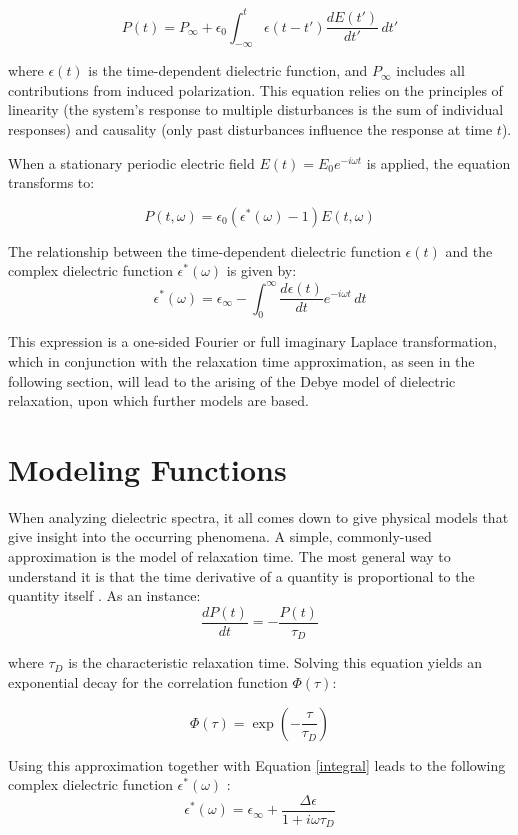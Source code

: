 \[
P(t) = P_\infty + \epsilon_0 \int_{-\infty}^{t} \epsilon(t - t') \frac{dE(t')}{dt'} \, dt'
\]

where \( \epsilon(t) \) is the time-dependent dielectric function, and \( P_\infty \) includes all contributions from induced polarization. This equation relies on the principles of linearity (the system's response to multiple disturbances is the sum of individual responses) and causality (only past disturbances influence the response at time \( t \)).

When a stationary periodic electric field \( E(t) = E_0 e^{-i\omega t} \) is applied, the equation transforms to:

\[
P(t, \omega) = \epsilon_0 \left(\epsilon^*(\omega) - 1\right) E(t, \omega)
\]

The relationship between the time-dependent dielectric function \( \epsilon(t) \) and the complex dielectric function \( \epsilon^*(\omega) \) is given by:
\begin{equation}
\epsilon^*(\omega) = \epsilon_\infty - \int_{0}^{\infty} \frac{d\epsilon(t)}{dt} e^{-i\omega t} \, dt
\label{integral}
\end{equation}

This expression is a one-sided Fourier or full imaginary Laplace transformation, which in conjunction with the relaxation time approximation, as seen in the following section, will lead to the arising of the Debye model of dielectric relaxation, upon which further models are based.
\section{Modeling Functions}

When analyzing dielectric spectra, it all comes down to give physical models that give insight into the occurring phenomena. A simple, commonly-used approximation is the model of relaxation time. The most general way to understand it is that the time derivative of a quantity is proportional to the quantity itself \cite{grundmann2021}. As an instance:
\[
\frac{dP(t)}{dt} = -\frac{P(t)}{\tau_D}
\]

where \( \tau_D \) is the characteristic relaxation time. Solving this equation yields an exponential decay for the correlation function \( \Phi(\tau) \):

\[
\Phi(\tau) = \exp\left(-\frac{\tau}{\tau_D}\right)
\]

Using this approximation together with Equation \ref{integral} leads to the following complex dielectric function \( \epsilon^*(\omega) \) \cite{kremer2003}:
\begin{equation}
\label{debye}
\epsilon^*(\omega) = \epsilon_\infty + \frac{\Delta \epsilon}{1 + i \omega \tau_D}
\end{equation}

